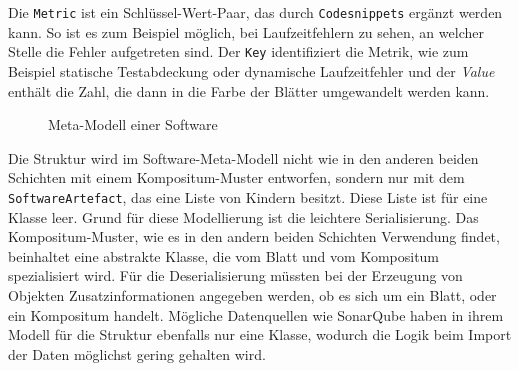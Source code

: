 Die \texttt{Metric} ist ein Schlüssel-Wert-Paar, das durch \texttt{Codesnippets} ergänzt werden kann. So ist es zum Beispiel möglich, bei Laufzeitfehlern zu sehen, an welcher Stelle die Fehler aufgetreten sind. Der \texttt{Key} identifiziert die Metrik, wie zum Beispiel statische Testabdeckung oder dynamische Laufzeitfehler und der \textit{Value} enthält die Zahl, die dann in die Farbe der Blätter umgewandelt werden kann.


\begin{figure}[htb]
\caption{Meta-Modell einer Software}
\label{fig:meta-model}
\end{figure}

Die Struktur wird im Software-Meta-Modell nicht wie in den anderen beiden Schichten mit einem Kompositum-Muster entworfen, sondern nur mit dem \texttt{SoftwareArtefact}, das eine Liste von Kindern besitzt. Diese Liste ist für eine Klasse leer. Grund für diese Modellierung ist die leichtere Serialisierung. Das Kompositum-Muster, wie es in den andern beiden Schichten Verwendung findet, beinhaltet eine abstrakte Klasse, die vom Blatt und vom Kompositum spezialisiert wird. Für die Deserialisierung müssten bei der Erzeugung von Objekten Zusatzinformationen angegeben werden, ob es sich um ein Blatt, oder ein Kompositum handelt. Mögliche Datenquellen wie SonarQube haben in ihrem Modell für die Struktur ebenfalls nur eine Klasse, wodurch die Logik beim Import der Daten möglichst gering gehalten wird.


